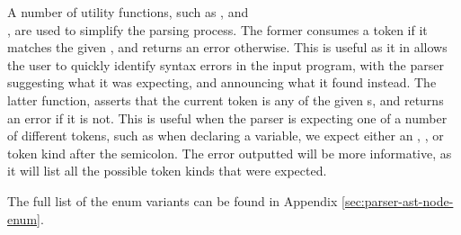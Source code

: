 A number of utility functions, such as , and
\\, are used to
simplify the parsing process. The former consumes a token if it matches the
given , and returns an error otherwise. This is useful as it in
allows the user to quickly identify syntax errors in the input program, with the
parser suggesting what it was expecting, and announcing what it found instead.
The latter function, asserts that the current token is any of the given
s, and returns an error if it is not. This is useful when the
parser is expecting one of a number of different tokens, such as when declaring
a variable, we expect either an , ,  or
 token kind after the semicolon. The error outputted will be more
informative, as it will list all the possible token kinds that were expected.

The full list of the  enum variants can be found in Appendix
\ref{sec:parser-ast-node-enum}.